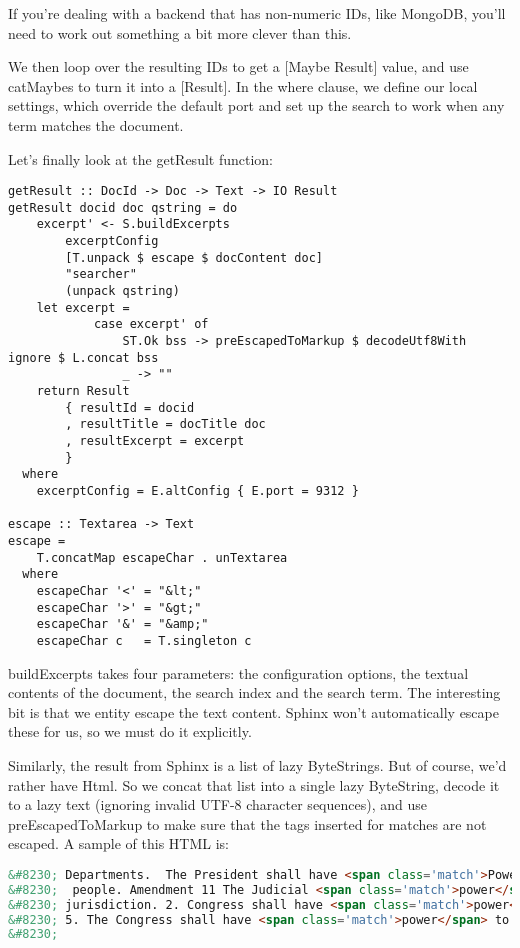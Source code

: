 If you're dealing with a backend that has non-numeric IDs, like MongoDB, you'll need to work out something a bit more clever than this.

We then loop over the resulting IDs to get a [Maybe Result] value, and use catMaybes to turn it into a [Result]. In the where clause, we define our local settings, which override the default port and set up the search to work when any term matches the document.

Let's finally look at the getResult function:

\begin{lstlisting}
getResult :: DocId -> Doc -> Text -> IO Result
getResult docid doc qstring = do
    excerpt' <- S.buildExcerpts
        excerptConfig
        [T.unpack $ escape $ docContent doc]
        "searcher"
        (unpack qstring)
    let excerpt =
            case excerpt' of
                ST.Ok bss -> preEscapedToMarkup $ decodeUtf8With ignore $ L.concat bss
                _ -> ""
    return Result
        { resultId = docid
        , resultTitle = docTitle doc
        , resultExcerpt = excerpt
        }
  where
    excerptConfig = E.altConfig { E.port = 9312 }

escape :: Textarea -> Text
escape =
    T.concatMap escapeChar . unTextarea
  where
    escapeChar '<' = "&lt;"
    escapeChar '>' = "&gt;"
    escapeChar '&' = "&amp;"
    escapeChar c   = T.singleton c
\end{lstlisting}

buildExcerpts takes four parameters: the configuration options, the textual contents of the document, the search index and the search term. The interesting bit is that we entity escape the text content. Sphinx won't automatically escape these for us, so we must do it explicitly.

Similarly, the result from Sphinx is a list of lazy ByteStrings. But of course, we'd rather have Html. So we concat that list into a single lazy ByteString, decode it to a lazy text (ignoring invalid UTF-8 character sequences), and use preEscapedToMarkup to make sure that the tags inserted for matches are not escaped. A sample of this HTML is:

\begin{lstlisting}[language=HTML]
&#8230; Departments.  The President shall have <span class='match'>Power</span> to fill up all Vacancies
&#8230;  people. Amendment 11 The Judicial <span class='match'>power</span> of the United States shall
&#8230; jurisdiction. 2. Congress shall have <span class='match'>power</span> to enforce this article by
&#8230; 5. The Congress shall have <span class='match'>power</span> to enforce, by appropriate legislation
&#8230;
\end{lstlisting}

